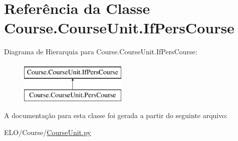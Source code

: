 \hypertarget{classCourse_1_1CourseUnit_1_1IfPersCourse}{\section{Referência da Classe Course.\-Course\-Unit.\-If\-Pers\-Course}
\label{d0/d62/classCourse_1_1CourseUnit_1_1IfPersCourse}
}
Diagrama de Hierarquia para Course.\-Course\-Unit.\-If\-Pers\-Course\-:\begin{figure}[H]
\begin{center}
\leavevmode
\includegraphics[height=2.000000cm]{d0/d62/classCourse_1_1CourseUnit_1_1IfPersCourse}
\end{center}
\end{figure}


A documentação para esta classe foi gerada a partir do seguinte arquivo\-:\begin{DoxyCompactItemize}
\item 
E\-L\-O/\-Course/\hyperlink{CourseUnit_8py}{Course\-Unit.\-py}\end{DoxyCompactItemize}

